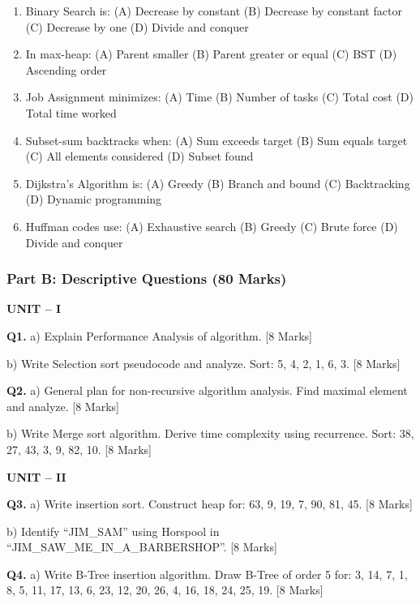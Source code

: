 \documentclass[11pt,a4paper]{article}
\begin{document}
\begin{enumerate}
\item Binary Search is: (A) Decrease by constant (B) Decrease by constant factor (C) Decrease by one (D) Divide and conquer

\item In max-heap: (A) Parent smaller (B) Parent greater or equal (C) BST (D) Ascending order

\item Job Assignment minimizes: (A) Time (B) Number of tasks (C) Total cost (D) Total time worked

\item Subset-sum backtracks when: (A) Sum exceeds target (B) Sum equals target (C) All elements considered (D) Subset found

\item Dijkstra's Algorithm is: (A) Greedy (B) Branch and bound (C) Backtracking (D) Dynamic programming

\item Huffman codes use: (A) Exhaustive search (B) Greedy (C) Brute force (D) Divide and conquer
\end{enumerate}

\subsubsection*{Part B: Descriptive Questions (80 Marks)}

\textbf{UNIT -- I}

\textbf{Q1.} a) Explain Performance Analysis of algorithm. \hfill [8 Marks]

b) Write Selection sort pseudocode and analyze. Sort: 5, 4, 2, 1, 6, 3. \hfill [8 Marks]

\textbf{Q2.} a) General plan for non-recursive algorithm analysis. Find maximal element and analyze. \hfill [8 Marks]

b) Write Merge sort algorithm. Derive time complexity using recurrence. Sort: 38, 27, 43, 3, 9, 82, 10. \hfill [8 Marks]

\textbf{UNIT -- II}

\textbf{Q3.} a) Write insertion sort. Construct heap for: 63, 9, 19, 7, 90, 81, 45. \hfill [8 Marks]

b) Identify ``JIM\_SAM'' using Horspool in ``JIM\_SAW\_ME\_IN\_A\_BARBERSHOP''. \hfill [8 Marks]

\textbf{Q4.} a) Write B-Tree insertion algorithm. Draw B-Tree of order 5 for: 3, 14, 7, 1, 8, 5, 11, 17, 13, 6, 23, 12, 20, 26, 4, 16, 18, 24, 25, 19. \hfill [8 Marks]
\end{document}
